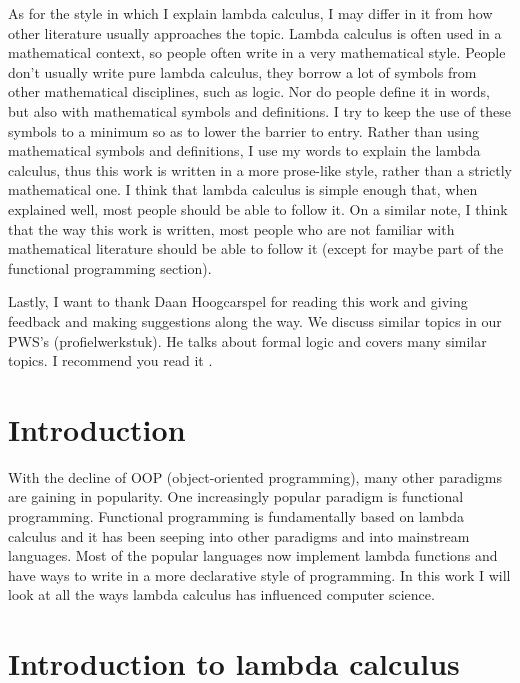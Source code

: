 \documentclass[11pt]{article}
\begin{document}
As for the style in which I explain lambda calculus, I may differ in it from
how other literature usually approaches the topic. Lambda calculus is often
used in a mathematical context, so people often write in a very mathematical
style. People don't usually write pure lambda calculus, they borrow a lot of
symbols from other mathematical disciplines, such as logic. Nor do people
define it in words, but also with mathematical symbols and definitions. I try
to keep the use of these symbols to a minimum so as to lower the barrier to
entry. Rather than using mathematical symbols and definitions, I use my words
to explain the lambda calculus, thus this work is written in a more prose-like
style, rather than a strictly mathematical one. I think that lambda calculus is
simple enough that, when explained well, most people should be able to follow
it. On a similar note, I think that the way this work is written, most people
who are not familiar with mathematical literature should be able to follow it
(except for maybe part of the functional programming section).

Lastly, I want to thank Daan Hoogcarspel for reading this work and giving
feedback and making suggestions along the way. We discuss similar topics in our
PWS's (profielwerkstuk). He talks about formal logic and covers many similar
topics. I recommend you read it \parencite{daanbanaan}.

\newpage

\newpage
\thispagestyle{empty}
\mbox{}
\newpage

\tableofcontents
\newpage

\newpage
\thispagestyle{empty}
\mbox{}
\newpage


\section{Introduction}

With the decline of OOP (object-oriented programming), many other paradigms are
gaining in popularity. One increasingly popular paradigm is functional
programming. Functional programming is fundamentally based on lambda calculus
and it has been seeping into other paradigms and into mainstream languages.
Most of the popular languages now implement lambda functions and have ways to
write in a more declarative style of programming. In this work I will look at
all the ways lambda calculus has influenced computer science.

\section{Introduction to lambda calculus}
\end{document}
